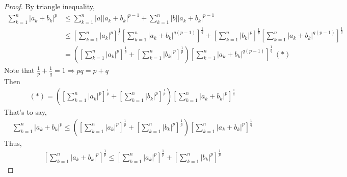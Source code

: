 \documentclass{article}
\begin{document}
\begin{proof}
	By triangle inequality,
	\begin{align*}
		\sum_{k=1}^{n}\left|a_{k}+b_{k}\right|^{p} &\leq \sum_{k=1}^{n}\left|a\right|\left|a_{k}+b_{k}\right|^{p-1}+\sum_{k=1}^{n}\left|b\right|\left|a_{k}+b_{k}\right|^{p-1} \\
		&\leq \left[\sum_{k=1}^{n}\left|a_{k}\right|^{p} \right]^{\frac{1}{p}}\left[\sum_{k=1}^{n}\left|a_{k}+b_{k}\right|^{q(p-1)} \right]^{\frac{1}{q}} + \left[\sum_{k=1}^{n}\left|b_{k}\right|^{p} \right]^{\frac{1}{p}}\left[\sum_{k=1}^{n}\left|a_{k}+b_{k}\right|^{q(p-1)} \right]^{\frac{1}{q}}\\
		&= (\left[\sum_{k=1}^{n}\left|a_{k}\right|^{p} \right]^{\frac{1}{p}}+\left[\sum_{k=1}^{n}\left|b_{k}\right|^{p} \right]^{\frac{1}{p}})\left[\sum_{k=1}^{n}\left|a_{k}+b_{k}\right|^{q(p-1)} \right]^{\frac{1}{q}}\ (*)	
	\end{align*} 
	Note that $\frac{1}{p}+\frac{1}{q}=1 \Rightarrow pq=p+q$\\
	Then
	\begin{align*}
		(*)=(\left[\sum_{k=1}^{n}\left|a_{k}\right|^{p} \right]^{\frac{1}{p}}+\left[\sum_{k=1}^{n}\left|b_{k}\right|^{p} \right]^{\frac{1}{p}})\left[\sum_{k=1}^{n}\left|a_{k}+b_{k}\right|^{p} \right]^{\frac{1}{q}}
	\end{align*}
	That's to say, 
	\begin{align*}
		\sum_{k=1}^{n}\left|a_{k}+b_{k}\right|^{p} \leq (\left[\sum_{k=1}^{n}\left|a_{k}\right|^{p} \right]^{\frac{1}{p}}+\left[\sum_{k=1}^{n}\left|b_{k}\right|^{p} \right]^{\frac{1}{p}})\left[\sum_{k=1}^{n}\left|a_{k}+b_{k}\right|^{p} \right]^{\frac{1}{q}}
	\end{align*}
	Thus, 
	\begin{align*}
		\left[\sum_{k=1}^{n} \left|a_{k}+b_{k}\right|^{p}\right]^{\frac{1}{p}}\leq \left[\sum_{k=1}^{n} \left|a_{k}\right|^{p}\right]^{\frac{1}{p}}+\left[\sum_{k=1}^{n} \left|b_{k}\right|^{p}\right]^{\frac{1}{p}}
	\end{align*}
\end{proof}
\end{document}
